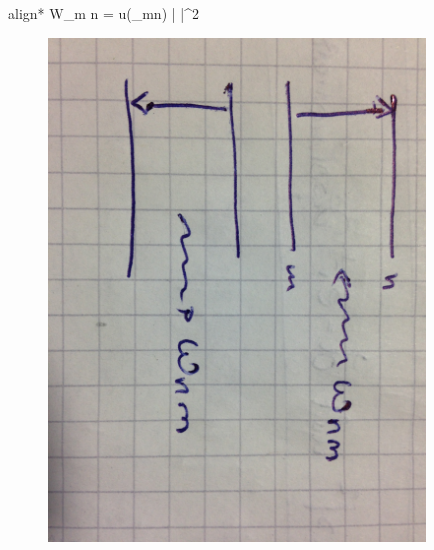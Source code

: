 		\begin{empheq}[box=\boxed]{align*}
		W_{m \leftarrow n} =  u(\omega_{mn})
		|  |^2
		\end{empheq}
		\begin{figure} [h]
			\begin{center}
				\includegraphics[width=10cm]{Bild1.jpg}
			\end{center}
		\end{figure}
		\FloatBarrier